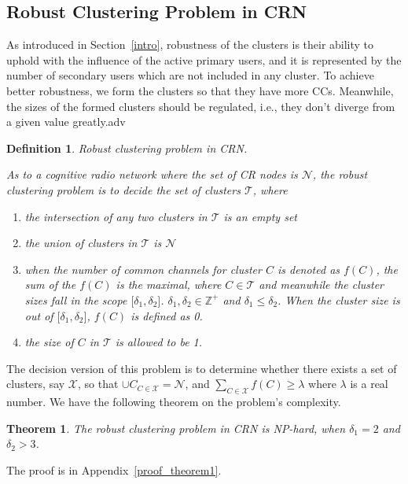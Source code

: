\documentclass[times]{ettauth}
\newcommand{\ie}{i.e., }
\theoremstyle{mytheoremstyle}
\newtheorem{theorem}{Theorem}[section]
\theoremstyle{mytheoremstyle}
\theoremstyle{mytheoremstyle}
\newtheorem{mydef}{Definition}
\begin{document}
\subsection{Robust Clustering Problem in CRN}
\label{problem}

As introduced in Section~\ref{intro}, robustness of the clusters is their ability to uphold with the influence of the active primary users, and it is represented by the number of secondary users which are not included in any cluster.
To achieve better robustness, we form the clusters so that they have more CCs.
Meanwhile, the sizes of the formed clusters should be regulated, \ie they don't diverge from a given value greatly.adv



\begin{mydef}
\label{def_centralized_clustering}
\textit{Robust clustering problem in CRN.}

As to a cognitive radio network where the set of CR nodes is $\mathcal{N}$, the robust clustering problem is to decide the set of clusters $\mathcal{T}$, where 
\begin{enumerate}
\setlength{\itemindent}{.05in}
\item the intersection of any two clusters in $\mathcal{T}$ is an empty set
\item the union of clusters in $\mathcal{T}$ is $\mathcal{N}$
\item when the number of common channels for cluster $C$ is denoted as $f(C)$, the sum of the $f(C)$ is the maximal, where $C\in \mathcal{T}$ and meanwhile the cluster sizes fall in the scope $\big[\delta_1, \delta_2\big]$.
$\delta_1, \delta_2\in \mathbb{Z}^+$ and $\delta_1 \leq \delta_2$.
When the cluster size is out of $\big[\delta_1, \delta_2\big]$, $f(C)$ is defined as 0.

\item the size of $C$ in $\mathcal{T}$ is allowed to be 1.
\end{enumerate}
\end{mydef}

The decision version of this problem is to determine whether there exists a set of clusters, say $\mathcal{X}$, so that $\cup C_{C\in\mathcal{X}} = \mathcal{N}$, and $\sum_{C\in \mathcal{X}} f(C) \geqslant \lambda$ where $\lambda$ is a real number.
We have the following theorem on the problem's complexity.
\begin{theorem}
\label{theorem1}
The robust clustering problem in CRN is NP-hard, when $\delta_1=2$ and $\delta_2 > 3$.
\end{theorem}
The proof is in Appendix~\ref{proof_theorem1}.
\end{document}
